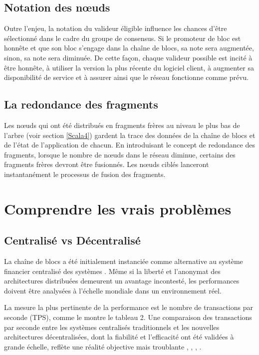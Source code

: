 \documentclass[journal]{IEEEtran}
\begin{document}
\subsection{Notation des nœuds}
Outre l'enjeu, la notation du valideur éligible influence les chances d'être sélectionné dans le cadre du groupe de consensus. Si le promoteur de bloc est honnête et que son bloc s'engage dans la chaîne  de blocs, sa note sera augmentée, sinon, sa note sera diminuée. De cette façon, chaque valideur possible est incité à être honnête, à utiliser la version la plus récente du logiciel client, à augmenter sa disponibilité de service et à assurer ainsi que le réseau fonctionne comme prévu.

\subsection{La redondance des fragments}
Les nœuds qui ont été distribués en fragments frères au niveau le plus bas de l'arbre (voir section  \ref{Scala4}) gardent la trace des données de la chaîne  de blocs et de l'état de l'application de chacun. En introduisant le concept de redondance des fragments, lorsque le nombre de nœuds dans le réseau diminue, certains des fragments frères devront être fusionnés. Les nœuds ciblés lanceront instantanément le processus de fusion des fragments.


\section{Comprendre les vrais problèmes}
\label{Comp}

\subsection{Centralisé vs Décentralisé}
\label{Comp1}
La chaîne  de blocs a été initialement instanciée comme alternative au système financier centralisé des systèmes \cite{45}. Même si la liberté et l'anonymat des architectures distribuées demeurent un avantage incontesté, les performances doivent être analysées à l'échelle mondiale dans un environnement réel.

La mesure la plus pertinente de la performance est le nombre de transactions par seconde (TPS), comme le montre le tableau 2. Une comparaison des transactions par seconde entre les systèmes centralisés traditionnels et les nouvelles architectures décentralisées, dont la fiabilité et l'efficacité ont été validées à grande échelle, reflète une réalité objective mais troublante \cite{46}, \cite{47}, \cite{48}, \cite{49}.
\end{document}
